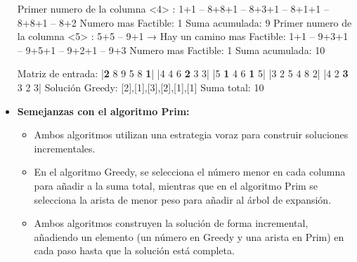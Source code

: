 \documentclass[12pt, letterpaper]{article}
\begin{document}
\begin{itemize}
            Primer numero de la columna <4> : 1+1 -- 8+8+1 -- 8+3+1 -- 8+1+1 -- 8+8+1 -- 8+2\newline
            Numero mas Factible: 1\newline
            Suma acumulada: 9\newline
  \newpage %
            Primer numero de la columna <5> : 5+5 -- 9+1\newline
              → Hay un camino mas Factible: 1+1 -- 9+3+1 -- 9+5+1 -- 9+2+1 -- 9+3\newline
            Numero mas Factible: 1\newline
            Suma acumulada: 10\newline

            Matriz de entrada:\newline
            |\textbf{2} 8 9 5 8 \textbf{1}|\newline
            |4 4 6 \textbf{2} 3 3|\newline
            |5 \textbf{1} 4 6 \textbf{1} 5|\newline
            |3 2 5 4 8 2|\newline
            |4 2 \textbf{3} 3 2 3|\newline
            Solución Greedy: [2],[1],[3],[2],[1],[1]\newline
            Suma total: 10
  \newpage %

        \item\textbf{Semejanzas con el algoritmo Prim:}
          \begin{itemize}
            \item Ambos algoritmos utilizan una estrategia voraz para construir soluciones incrementales.
            \item En el algoritmo Greedy, se selecciona el número menor en cada columna para añadir a la suma total, mientras que en el algoritmo Prim se selecciona la arista de menor peso para añadir al árbol de expansión.
            \item Ambos algoritmos construyen la solución de forma incremental, añadiendo un elemento (un número en Greedy y una arista en Prim) en cada paso hasta que la solución está completa.
          \end{itemize}


\end{itemize}
\end{document}
